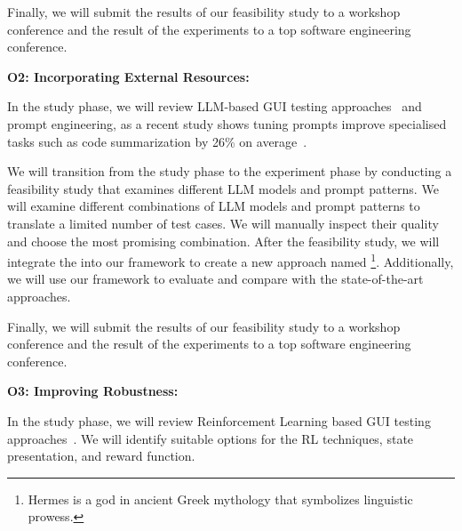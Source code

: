 \smallskip
Finally, we will submit the results of our  feasibility study to a workshop conference and the result of the \testreuse experiments to a top software engineering conference. 



\smallskip
\noindent
\textbf{O2: Incorporating External Resources:}  

\noindent
In the study phase, we will review LLM-based GUI testing approaches~\cite{Zimmermann:GPT3GUITest:2023:ICSTW, liu:GUIInputLLM:ICSE:2023} and prompt engineering, as a recent study shows tuning prompts improve specialised tasks such as code summarization  by 26\% on average~\cite{wang:prompt:FSE:2023}.

\smallskip
We will transition from the study phase to the experiment phase by conducting a feasibility study that examines different LLM models and prompt patterns.
We will examine different combinations of LLM models and prompt patterns to translate a limited number of test cases.
We will manually inspect their quality and choose the most promising combination.
After the feasibility study, we will integrate the \llmtranslator into our framework to create a new \testreuse approach named \llmtool\footnote{Hermes is a god in ancient Greek mythology that symbolizes linguistic prowess.}.
Additionally, we will use our \tme framework to evaluate \llmtool and compare with the state-of-the-art \testreuse approaches.

\smallskip
Finally, we will submit the results of our  feasibility study to a workshop conference and the result of the \testreuse experiments to a top software engineering conference. 




\smallskip
\noindent
\textbf{O3: Improving Robustness:}  

\noindent
In the study phase, we will review Reinforcement Learning based  GUI testing approaches~\cite{Pan:QTesting:ISSTA:2020,Romdhana:ARES:TOSEM:2022}. 
We will identify suitable options for the RL techniques, state presentation, and reward function.

